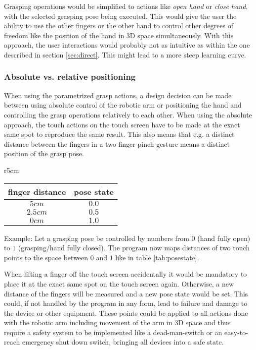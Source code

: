 \documentclass[a4paper]{article}
\begin{document}
Grasping operations would be simplified to actions like \textit{open hand} or \textit{close hand}, with the selected grasping pose being executed. This would give the user the ability to use the other fingers or the other hand to control other degrees of freedom like the position of the hand in 3D space simultaneously. With this approach, the user interactions would probably not as intuitive as within the one described in section \ref{sec:direct}. This might lead to a more steep learning curve.

\subsubsection{Absolute vs. relative positioning}

When using the parametrized grasp actions, a design decision can be made between using absolute control of the robotic arm or positioning the hand and controlling the grasp operations relatively to each other. When using the absolute approach, the touch actions on the touch screen have to be made at the exact same spot to reproduce the same result. This also means that e.g. a distinct distance between the fingers in a two-finger  pinch-gesture means a distinct position of the grasp pose. 

\begin{wraptable}{r}{5cm}
	
	\begin{tabular}{|c|c|}
		\hline
		finger distance&pose state \\
		\hline
		$5cm$&$0.0$ \\
		$2.5cm$&$0.5$ \\
		$0cm$&$1.0$ \\
		\hline
	\end{tabular}
	\caption{Finger distance to pose state mapping (ex.)\label{tab:posestate}}
\end{wraptable}


Example: Let a grasping pose be controlled by numbers from $0$ (hand fully open) to $1$ (grasping/hand fully closed). The program now maps distances of two touch points to the space between $0$ and $1$ like in table \ref{tab:posestate}.

When lifting a finger off the touch screen accidentally it would be mandatory to place it at the exact same spot on the touch screen again. Otherwise, a new distance of the fingers will be measured and a new pose state would be set. This could, if not handled by the program in any form, lead to failure and damage to the device or other equipment. These points could be applied to all actions done with the robotic arm including movement of the arm in 3D space and thus require a safety system to be implemented like a dead-man-switch or an easy-to-reach emergency shut down switch, bringing all devices into a safe state.
\end{document}

